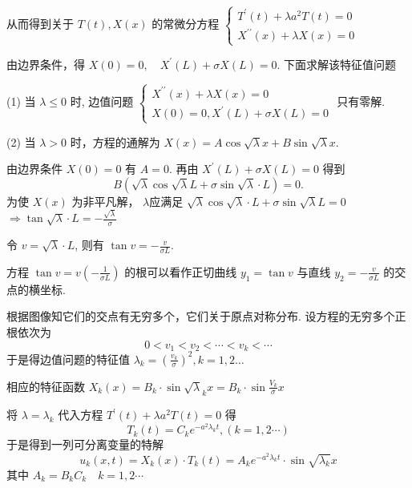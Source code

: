 \begin{questions}
\begin{solution}
从而得到关于 $ T(t) , X(x) $ 的常微分方程
$\left\{\begin{array}{l}
T^{\prime}(t)+\lambda a^{2} T(t)=0 \\
X^{\prime \prime}(x)+\lambda X(x)=0
\end{array}\right.$

由边界条件，得 $ X(0)=0 , \quad X^{\prime}(L)+\sigma X(L)=0 $. 下面求解该特征值问题

(1) 当 $ \lambda \leqslant 0 $ 时, 边值问题 $ \left\{\begin{array}{l}X^{\prime \prime}(x)+\lambda X(x)=0 \\ X(0)=0, X^{\prime}(L)+\sigma X(L)=0\end{array}\right. $ 只有零解.

(2) 当 $ \lambda>0 $ 时，方程的通解为 $ X(x)=A \cos \sqrt{\lambda} x+B \sin \sqrt{\lambda} x $.

由边界条件 $ X(0)=0 $ 有 $ A=0 $. 再由 $ X^{\prime}(L)+\sigma X(L)=0 $
得到 $$ B(\sqrt{\lambda} \cos \sqrt{\lambda} L+\sigma \sin \sqrt{\lambda} \cdot L)=0. $$
为使 $ X(x) $ 为非平凡解， $\lambda$应满足 $ \sqrt{\lambda} \cos \sqrt{\lambda} \cdot L+\sigma \sin \sqrt{\lambda} L=0 $
$\Rightarrow \tan \sqrt{\lambda} \cdot L=-\frac{\sqrt{\lambda}}{\sigma}$

令 $ v=\sqrt{\lambda} \cdot L $, 则有 $ \tan v=-\frac{v}{\sigma L} $.

方程 $ \tan v=v\left(-\frac{1}{\sigma L}\right) $ 的根可以看作正切曲线 $ y_{1}=\tan v $ 与直线 $ y_{2}=-\frac{v}{\sigma L} $ 的交点的横坐标.

根据图像知它们的交点有无穷多个，它们关于原点对称分布. 设方程的无穷多个正根依次为 $$ 0<v_{1}<v_{2}<\cdots<v_{k}<\cdots $$ 
于是得边值问题的特征值 $ \lambda_{k}=\left(\frac{v_{k}}{\sigma}\right)^{2}, k=1,2 \ldots $

相应的特征函数 $ X_{k}(x)=B_{k} \cdot \sin \sqrt{\lambda}_{k} x=B_{k} \cdot \sin \frac{V_{k}}{\sigma} x $

将 $ \lambda=\lambda_{k} $ 代入方程 $ T^{\prime}(t)+\lambda a^{2} T(t)=0 $
得 $$T_{k}(t)=C_{k} e^{-a^{2} \lambda_{k} t},(k=1,2 \cdots) $$
于是得到一列可分离变量的特解
$$
u_{k}(x, t)=X_{k}(x) \cdot T_{k}(t)=A_{k} e^{-a^{2} \lambda_{k} t} \cdot \sin \sqrt{\lambda_{k}} x
$$
其中 $ A_{k}=B_{k} C_{k} \quad k=1,2 \cdots $


\end{solution}
\end{questions}
